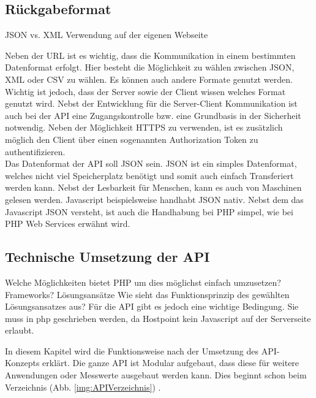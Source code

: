 \subsection{Rückgabeformat}
JSON vs. XML
Verwendung auf der eigenen Webseite

 Neben der URL ist es wichtig, dass die Kommunikation in einem bestimmten Datenformat erfolgt. Hier besteht die Möglichkeit zu wählen zwischen JSON, XML oder CSV zu wählen. Es können auch andere Formate genutzt werden. Wichtig ist jedoch, dass der Server sowie der Client wissen welches Format genutzt wird. Nebst der Entwicklung für die Server-Client Kommunikation ist auch bei der API eine Zugangskontrolle bzw. eine Grundbasis in der Sicherheit notwendig. Neben der Möglichkeit HTTPS zu verwenden, ist es zusätzlich möglich den Client über einen sogenannten Authorization Token zu authentifizieren.\\

Das Datenformat der API soll JSON sein. JSON ist ein simples Datenformat, welches nicht viel Speicherplatz benötigt und somit auch einfach Transferiert werden kann. Nebst der Lesbarkeit für Menschen, kann es auch von Maschinen gelesen werden. Javascript beispielsweise handhabt JSON nativ. Nebst dem das Javascript JSON versteht, ist auch die Handhabung bei PHP simpel, wie bei PHP Web Services \cite{LornaJaneMitchell2013oreilly} erwähnt wird.

\subsection{Technische Umsetzung der API}
Welche Möglichkeiten bietet PHP um dies möglichst einfach umzusetzen? Frameworks? Lösungsansätze
Wie sieht das Funktionsprinzip des gewählten Lösungsansatzes aus?
 Für die API gibt es jedoch eine wichtige Bedingung. Sie muss in php geschrieben werden, da Hostpoint kein Javascript auf der Serverseite erlaubt.



In diesem Kapitel wird die Funktionsweise nach der Umsetzung des API-Konzepts erklärt. Die ganze API ist Modular aufgebaut, dass diese für weitere Anwendungen oder Messwerte ausgebaut werden kann. Dies beginnt schon beim Verzeichnis (Abb. \ref{img:APIVerzeichnis}) .

